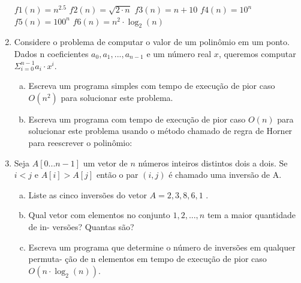 \documentclass[a4paper,10pt]{article}
\begin{document}
\begin{enumerate}
\begin{center}
$f1(n) = n^{2.5}$ \linebreak
$f2(n) = \sqrt{2\cdot n}$ \linebreak
$f3(n) = n + 10$ \linebreak
$f4(n) = 10^n$ \linebreak
$f5(n) = 100^n$ \linebreak
$f6(n) = n^2 \cdot \log_2(n)$ \linebreak

\end{center}

\item Considere o problema de computar o valor de um polinômio em um ponto. 
Dados n coeficientes $a_0 , a_1 , . . . , a_{n-1}$ e um número real $x$, queremos computar $\Sigma_{i=0}^{n-1} a_i \cdot x^i$.
  
  \begin{enumerate}[(a)]
\item Escreva um programa simples com tempo de execução de pior caso $O(n^2)$ para solucionar este problema.
\item Escreva um programa com tempo de execução de pior caso $O(n)$ para solucionar este problema 
usando o método chamado de regra de Horner para reescrever o polinômio:
  \end{enumerate}



\item Seja $A[0...n-1]$ um vetor de $n$ números inteiros distintos dois a dois. Se $i<j$ e $A[i]>A[j]$
então o par $(i,j)$ é chamado uma inversão de A.

  \begin{enumerate}[(a)]
\item Liste as cinco inversões do vetor $A = 2, 3, 8, 6, 1$ .
\item Qual vetor com elementos no conjunto ${1, 2, . . . , n}$ tem a maior quantidade de in-
versões? Quantas são?
\item Escreva um programa que determine o número de inversões em qualquer permuta-
ção de n elementos em tempo de execução de pior caso $O(n \cdot \log_2(n))$.
  \end{enumerate}
  
\end{enumerate} %
\end{document}
